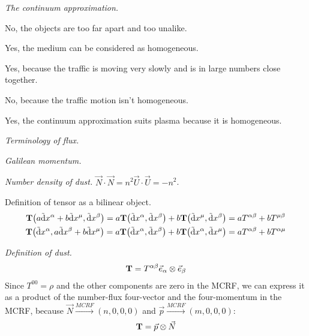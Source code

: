 \documentclass{report}
\begin{document}
\begin{subquests}
	\item \emph{The continuum approximation.}
	\begin{subquests}
		\item 
		No, the objects are too far apart and too unalike.

		\item
		Yes, the medium can be considered as homogeneous.

		\item
		Yes, because the traffic is moving very slowly and is in large numbers close together.

		\item
		No, because the traffic motion isn't homogeneous.

		\item
		Yes, the continuum approximation suits plasma because it is homogeneous.
	\end{subquests}

	\item \emph{Terminology of flux.}

	\item \emph{Galilean momentum.}
	\begin{subquests}
		\item

		\item
	\end{subquests}

	\item \emph{Number density of dust.}
	$\vec{N}\cdot\vec{N} = n^2\vec{U}\cdot\vec{U} = -n^2$.

	\item {Definition of tensor as a bilinear object.}
	\begin{gather*}
		{\vb T}\pqty{a\tilde{\dd}x^{\alpha} + b\tilde{\dd}x^{\mu}, \tilde{\dd}x^{\beta}} = a{\vb T}\pqty{\tilde{\dd}x^{\alpha}, \tilde{\dd}x^{\beta}} + b{\vb T}\pqty{\tilde{\dd}x^{\mu}, \tilde{\dd}x^{\beta}} = a T^{\alpha\beta} + b T^{\mu\beta}\\
		{\vb T}\pqty{\tilde{\dd}x^{\alpha}, a\tilde{\dd}x^{\beta} + b\tilde{\dd}x^{\mu}} = a{\vb T}\pqty{\tilde{\dd}x^{\alpha}, \tilde{\dd}x^{\beta}} + b{\vb T}\pqty{\tilde{\dd}x^{\alpha}, \tilde{\dd}x^{\mu}} = a T^{\alpha\beta} + b T^{\alpha\mu}
	\end{gather*}

	\item \emph{Definition of dust.}
	\begin{gather*}
			\vb T = T^{\alpha\beta} \vec{e}_{\alpha} \otimes \vec{e}_{\beta}
		\end{gather*}
		Since $T^{00} = \rho$ and the other components are zero in the MCRF, we can express it as a product of the number-flux four-vector and the four-momentum in the MCRF, because $\vec{N} \stackrel{MCRF}\longrightarrow (n, 0, 0, 0)$ and $\vec{p} \stackrel{MCRF}\longrightarrow (m, 0, 0, 0)$:
		\begin{gather*}
			\vb T = \vec{p} \otimes \vec{N}
		\end{gather*}


\end{subquests}
\end{document}
